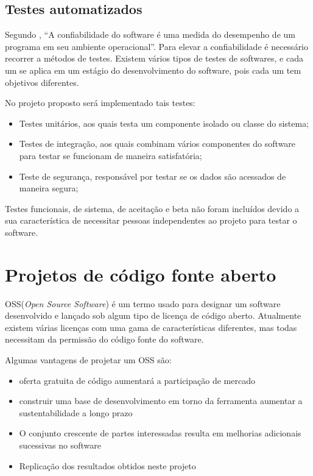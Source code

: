 
\subsection{Testes automatizados}

Segundo \cite{mathur1991performance}, “A confiabilidade do software é uma medida do desempenho de um programa em seu ambiente operacional”. Para elevar a confiabilidade é necessário recorrer a métodos de testes. Existem vários tipos de testes de softwares, e cada um se aplica em um estágio do desenvolvimento do software, pois cada um tem objetivos diferentes\cite{nidhra2012black}. \par
No projeto proposto será implementado tais testes: \par
\begin{itemize}  
\item Testes unitários, aos quais testa um componente isolado ou classe do sistema;
\item Testes de integração, aos quais combinam vários componentes do software para testar se funcionam de maneira satisfatória;
\item Teste de segurança, responsável por testar se os dados são acessados de maneira segura;
\end{itemize}
Testes funcionais, de sistema, de aceitação e beta não foram incluídos devido a sua característica de necessitar pessoas independentes ao projeto para testar o software.

\section{Projetos de código fonte aberto}
OSS(\textit{Open Source Software}) é um termo usado para designar um software desenvolvido e lançado sob algum tipo de licença de código aberto. Atualmente existem várias licenças com uma gama de características diferentes, mas todas necessitam da permissão do código fonte do software\cite{crowston2003defining}.

Algumas vantagens de projetar um OSS são:
\begin{itemize}  
\item oferta gratuita de código aumentará a participação de mercado\cite{fitzgerald2006transformation}
\item construir uma base de desenvolvimento em torno da ferramenta aumentar a sustentabilidade a longo prazo\cite{nyman2011forking}
\item O conjunto crescente de partes interessadas resulta em melhorias adicionais sucessivas no software\cite{heron2013open}
\item Replicação dos resultados obtidos neste projeto
\end{itemize}


